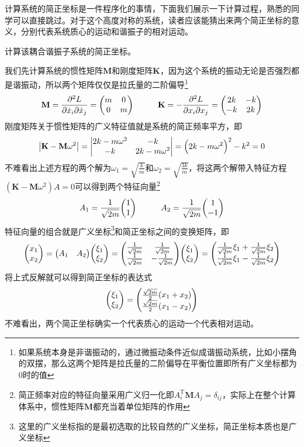 \documentclass[../../main.tex]{subfiles}
\begin{document}
计算系统的简正坐标是一件程序化的事情，下面我们展示一下计算过程，熟悉的同学可以直接跳过。对于这个高度对称的系统，读者应该能猜出来两个简正坐标的意义，分别代表系统质心的运动和谐振子的相对运动。
\begin{example}
    计算该耦合谐振子系统的简正坐标。
    \begin{solution}
        我们先计算系统的惯性矩阵\(\mathbf{M}\)和刚度矩阵\(\mathbf{K}\)，因为这个系统的振动无论是否强烈都是谐振动，所以两个矩阵仅仅是拉氏量的二阶偏导\footnote{如果系统本身是非谐振动的，通过微振动条件近似成谐振动系统，比如小摆角的双摆，那么这两个矩阵是拉氏量的二阶偏导在平衡位置即所有广义坐标都为0时的值}
        \begin{equation}
            \mathbf{M}=\pdv[2]{L}{\dot{x}_i}{\dot{x}_j}=\mqty(m & 0 \\ 0 & m)\qquad\quad \mathbf{K}=-\pdv[2]{L}{x_i}{x_j}=\mqty(2k & -k \\ -k & 2k)
        \end{equation}
        刚度矩阵关于惯性矩阵的广义特征值就是系统的简正频率平方，即
        \begin{equation}
            \abs{\mathbf{K}-\mathbf{M}\omega^2}=\mdet{2k-m\omega^2 & -k \\ -k & 2k-m\omega^2}=\Big(2k-m\omega^2\Big)^2-k^2=0
        \end{equation}
        不难看出上述方程的两个解为\(\omega_1=\sqrt{\frac{k}{m}}\)和\(\omega_2=\sqrt{\frac{3k}{m}}\)，将这两个解带入特征方程\((\mathbf{K}-\mathbf{M}\omega^2)A=0\)可以得到两个特征向量\footnote{简正频率对应的特征向量采用广义归一化即\(A_i^{\mathrm{T}}\mathbf{M}A_j=\delta_{ij}\)，实际上在整个计算体系中，惯性矩阵\(\mathbf{M}\)都充当着单位矩阵的作用}
        \begin{equation}
            A_1=\frac{1}{\sqrt{2m}}\mqty(1\\1)\qquad\quad A_2=\frac{1}{\sqrt{2m}}\mqty(\admat{1\\-1})
        \end{equation}
        特征向量的组合就是广义坐标\footnote{这里的广义坐标指的是最初选取的比较自然的广义坐标，简正坐标本质也是广义坐标}和简正坐标之间的变换矩阵，即
        \begin{equation}\label{eq:广义坐标简正坐标变换}
            \mqty(x_1 \\ x_2)=\mqty(A_1& A_2)\mqty(\xi_1\\ \xi_2)=\mqty(\frac{1}{\sqrt{2m}} &\frac{1}{\sqrt{2m}} \\ \frac{1}{\sqrt{2m}} & -\frac{1}{\sqrt{2m}})\mqty(\xi_1\\ \xi_2)=\mqty(\frac{1}{\sqrt{2m}}\xi_1+\frac{1}{\sqrt{2m}}\xi_2 \\ \frac{1}{\sqrt{2m}}\xi_1-\frac{1}{\sqrt{2m}}\xi_2)
        \end{equation}
        将上式反解就可以得到简正坐标的表达式
        \begin{equation}
            \mqty(\xi_1\\ \xi_2)=\mqty(\frac{\sqrt{2m}}{2}(x_1+x_2)\\ \frac{\sqrt{2m}}{2}(x_1-x_2))
        \end{equation}
        不难看出，两个简正坐标确实一个代表质心的运动一个代表相对运动。
    \end{solution}
\end{example}
\end{document}
